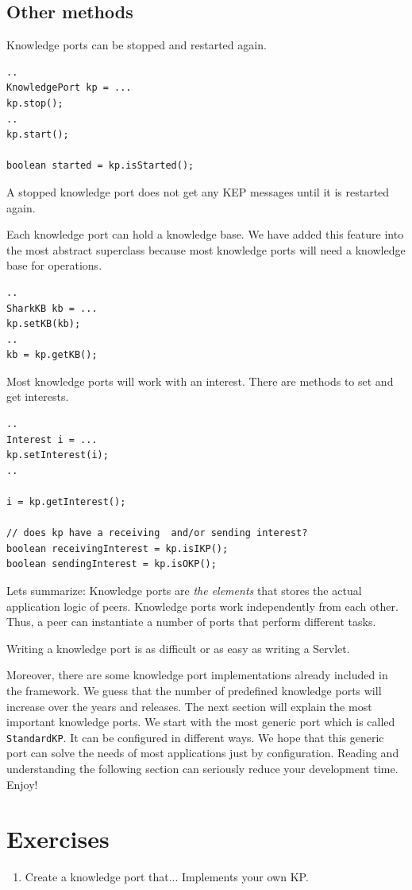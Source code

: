 \subsection{Other methods}
Knowledge ports can be stopped and restarted again.

\begin{verbatim}
..
KnowledgePort kp = ...
kp.stop();
..
kp.start();

boolean started = kp.isStarted();
\end{verbatim}

A stopped knowledge port does not get any KEP messages until it is restarted again. 

Each knowledge port can hold a knowledge base. We have added this feature into the most abstract superclass because most knowledge ports will need a knowledge base for operations.

\begin{verbatim}
..
SharkKB kb = ...
kp.setKB(kb);
..
kb = kp.getKB();
\end{verbatim}

Most knowledge ports will work with an interest. There are methods to set and get interests.

\begin{verbatim}
..
Interest i = ...
kp.setInterest(i);
..

i = kp.getInterest();

// does kp have a receiving  and/or sending interest?
boolean receivingInterest = kp.isIKP();
boolean sendingInterest = kp.isOKP();
\end{verbatim}

Lets summarize: Knowledge ports are {\it the elements} that stores the actual application logic of peers. Knowledge ports work independently from each other. Thus, a peer can instantiate a number of ports that perform different tasks.

Writing a knowledge port is as difficult or as easy as writing a Servlet. 

Moreover, there are some knowledge port implementations already included in the framework. We guess that the number of predefined knowledge ports will increase over the years and releases. The next section will explain the most important knowledge ports. We start with the most generic port which is called {\tt StandardKP}. It can be configured in different ways. We hope that this generic port can solve the needs of most applications just by configuration. Reading and understanding the following section can seriously reduce your development time. Enjoy!

\section{Exercises}

\begin{enumerate}
\item 
Create a knowledge port that... Implements your own KP.
\end{enumerate}
